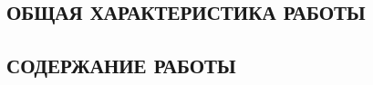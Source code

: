 \begin{center}
    \section*{ОБЩАЯ ХАРАКТЕРИСТИКА РАБОТЫ}
\end{center}

\newcommand{\actuality}{\pdfbookmark[1]{Актуальность}{actuality}\underline{\textbf{\actualityTXT}}}
\newcommand{\progress}{\pdfbookmark[1]{Разработанность темы}{progress}\underline{\textbf{\progressTXT}}}
\newcommand{\aim}{\pdfbookmark[1]{Цели}{aim}\underline{{\textbf\aimTXT}}}
\newcommand{\tasks}{\pdfbookmark[1]{Задачи}{tasks}\underline{\textbf{\tasksTXT}}}
\newcommand{\aimtasks}{\pdfbookmark[1]{Цели и задачи}{aimtasks}\aimtasksTXT}
\newcommand{\novelty}{\pdfbookmark[1]{Научная новизна}{novelty}\underline{\textbf{\noveltyTXT}}}
\newcommand{\influence}{\pdfbookmark[1]{Практическая значимость}{influence}\underline{\textbf{\influenceTXT}}}
\newcommand{\methods}{\pdfbookmark[1]{Методология и методы исследования}{methods}\underline{\textbf{\methodsTXT}}}
\newcommand{\defpositions}{\pdfbookmark[1]{Положения, выносимые на защиту}{defpositions}\underline{\textbf{\defpositionsTXT}}}
\newcommand{\reliability}{\pdfbookmark[1]{Достоверность}{reliability}\underline{\textbf{\reliabilityTXT}}}
\newcommand{\probation}{\pdfbookmark[1]{Апробация}{probation}\underline{\textbf{\probationTXT}}}
\newcommand{\contribution}{\pdfbookmark[1]{Личный вклад}{contribution}\underline{\textbf{\contributionTXT}}}
\newcommand{\publications}{\pdfbookmark[1]{Публикации}{publications}\underline{\textbf{\publicationsTXT}}}




\begin{center}
    \section*{СОДЕРЖАНИЕ РАБОТЫ}
\end{center}

